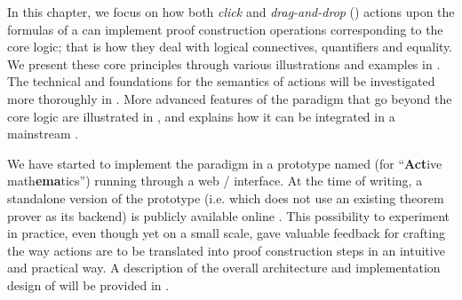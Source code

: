 \begin{scope}



In this chapter, we focus on how both \emph{click} and \emph{drag-and-drop}
() actions upon the formulas of a  can implement proof
construction operations corresponding to the core logic; that is how they deal
with logical connectives, quantifiers and equality. We present these core
principles through various illustrations and examples in .
The technical and  foundations for the semantics of
 actions
will be investigated more thoroughly in .
More advanced features of the  paradigm that go beyond the core
logic are illustrated in , and  explains how it
can be integrated in a mainstream .

\AP
We have started to implement the paradigm in a prototype named 
(for ``\textbf{Act}ive math\textbf{ema}tics'') running through a web
/ interface. At the time of writing, a standalone
version of the prototype (i.e. which does not use an existing theorem prover as
its backend) is publicly available online \cite{Actema:link}. This possibility
to experiment in practice, even though yet on a small scale, gave valuable
feedback for crafting the way  actions are to be translated into proof
construction steps in an intuitive and practical way. A description of the
overall architecture and implementation design of  will be provided
in .


\end{scope}
